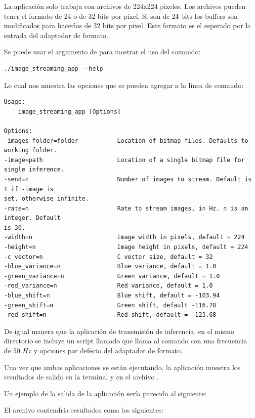     La aplicaci\'on  solo trabaja con archivos  de 224x224 pixeles. Los archivos  pueden tener el formato de 24 o de 32 bits por pixel. Si son de 24 bits los buffers son modificados para hacerlos de 32 bits por pixel. Este formato es el esperado por la entrada del adaptador de formato.

    Se puede usar el argumento  de  para mostrar el uso del comando:

    \begin{lstlisting}
./image_streaming_app --help    \end{lstlisting}

    Lo cual nos muestra las opciones que se pueden agregar a la l\'inea de comando:

    \begin{lstlisting}
Usage:
    image_streaming_app [Options]
    
Options:
-images_folder=folder           Location of bitmap files. Defaults to working folder.
-image=path                     Location of a single bitmap file for single inference.
-send=n                         Number of images to stream. Default is 1 if -image is 
set, otherwise infinite.
-rate=n                         Rate to stream images, in Hz. n is an integer. Default 
is 30.
-width=n                        Image width in pixels, default = 224
-height=n                       Image height in pixels, default = 224
-c_vector=n                     C vector size, default = 32
-blue_variance=n                Blue variance, default = 1.0
-green_variance=n               Green variance, default = 1.0
-red_variance=n                 Red variance, default = 1.0 
-blue_shift=n                   Blue shift, default = -103.94
-green_shift=n                  Green shift, default -116.78
-red_shift=n                    Red shift, default = -123.68\end{lstlisting}

    De igual manera que la aplicaci\'on de transmisi\'on de inferencia, en el mismo directorio se incluye un script llamado  que llama al comando  con una frecuencia de 50 $Hz$ y opciones por defecto del adaptador de formato.

    Una vez que ambas aplicaciones se est\'an ejecutando, la aplicaci\'on  muestra los resultados de salida en la terminal y en el archivo .

    Un ejemplo de la salida de la aplicaci\'on  ser\'ia parecido al siguiente:

    El archivo  contendr\'ia resultados como los siguientes:
    
    

    

    